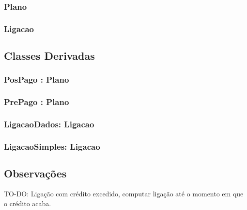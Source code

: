 \subsubsection{Plano} \label{sec:plano}

\subsubsection{Ligacao} \label{sec:ligacao}

\subsection{Classes Derivadas} \label{sec:classes_derivadas}

\subsubsection{PosPago : Plano} \label{sec:pospago}

\subsubsection{PrePago : Plano} \label{sec:prepago}

\subsubsection{LigacaoDados: Ligacao} \label{sec:ligacaodados}

\subsubsection{LigacaoSimples: Ligacao} \label{sec:ligacaosimples}

\subsection{Observações} \label{sec:observacoes}

TO-DO: Ligação com crédito excedido, computar ligação até o momento em que o crédito acaba.



